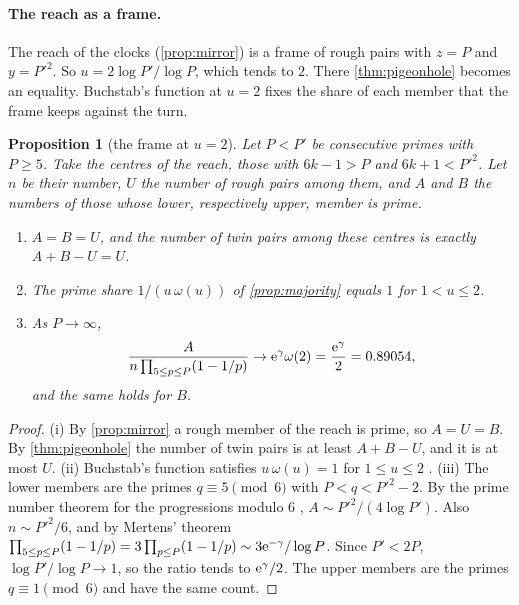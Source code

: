 \documentclass[11pt]{article}
\newtheorem{proposition}[theorem]{Proposition}
\theoremstyle{definition}\newtheorem{definition}[theorem]{Definition}
\theoremstyle{remark}\newtheorem{remark}[theorem]{Remark}
\begin{document}
\paragraph{The reach as a frame.} The reach of the clocks (\cref{prop:mirror}) is a frame of rough pairs with $z=P$ and $y=P'^2$. So $u=2\log P'/\log P$, which tends to $2$. There \cref{thm:pigeonhole} becomes an equality. Buchstab's function at $u=2$ fixes the share of each member that the frame keeps against the turn.

\begin{proposition}[the frame at $u=2$]\label{prop:window}
Let $P<P'$ be consecutive primes with $P\ge5$. Take the centres of the reach, those with $6k-1>P$ and $6k+1<P'^2$. Let $n$ be their number, $U$ the number of rough pairs among them, and $A$ and $B$ the numbers of those whose lower, respectively upper, member is prime.
\begin{enumerate}[label=\textup{(\roman*)}]
\item $A=B=U$, and the number of twin pairs among these centres is exactly $A+B-U=U$.
\item The prime share $1/(u\,\omega(u))$ of \cref{prop:majority} equals $1$ for $1<u\le2$.
\item As $P\to\infty$,
\[
\frac{A}{n\prod_{5\le p\le P}(1-1/p)}\to\mathrm e^{\gamma}\omega(2)=\frac{\mathrm e^{\gamma}}2=0.89054,
\]
and the same holds for $B$.
\end{enumerate}
\end{proposition}
\begin{proof}
(i) By \cref{prop:mirror} a rough member of the reach is prime, so $A=U=B$. By \cref{thm:pigeonhole} the number of twin pairs is at least $A+B-U$, and it is at most $U$.
(ii) Buchstab's function satisfies $u\,\omega(u)=1$ for $1\le u\le2$ \cite{FI}.
(iii) The lower members are the primes $q\equiv5\pmod6$ with $P<q<P'^2-2$. By the prime number theorem for the progressions modulo $6$ \cite{Davenport}, $A\sim P'^2/(4\log P')$. Also $n\sim P'^2/6$, and by Mertens' theorem \cite{Mertens74} $\prod_{5\le p\le P}(1-1/p)=3\prod_{p\le P}(1-1/p)\sim3\mathrm e^{-\gamma}/\log P$. Since $P'<2P$, $\log P'/\log P\to1$, so the ratio tends to $\mathrm e^\gamma/2$. The upper members are the primes $q\equiv1\pmod6$ and have the same count.
\end{proof}
\end{document}
